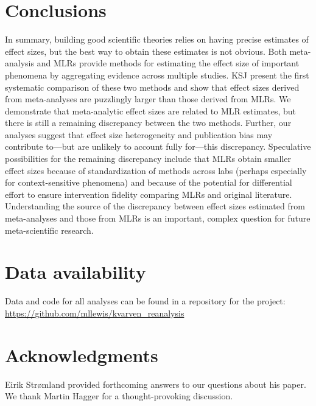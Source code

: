 \documentclass[man]{apa7}
\begin{document}
\section{Conclusions}

In summary, building good scientific theories relies on having precise estimates of effect sizes, but the best way to obtain these estimates is not obvious. Both meta-analysis and MLRs provide methods for estimating the effect size of important phenomena by aggregating evidence across multiple studies. KSJ present the first systematic comparison of these two methods and show that effect sizes derived from meta-analyses are puzzlingly larger than those derived from MLRs. We demonstrate that meta-analytic effect sizes are related to MLR estimates, but there is still a remaining discrepancy between the two methods. Further, our analyses suggest that effect size heterogeneity and publication bias may contribute to---but are unlikely to account fully for---this discrepancy. Speculative possibilities for the remaining discrepancy include that MLRs obtain smaller effect sizes because of standardization of methods across labs (perhaps especially for context-sensitive phenomena) and because of the potential for differential effort to ensure intervention fidelity comparing MLRs and original literature. Understanding the source of the discrepancy between effect sizes estimated from meta-analyses and those from MLRs is an important, complex question for future meta-scientific research. 

\nocite{kvarven2020comparing} 


\section{Data availability}
\noindent Data and code for all analyses can be found in a repository for the project: \href{https://github.com/mllewis/kvarven_reanalysis/}{https://github.com/mllewis/kvarven\_reanalysis}

\section{Acknowledgments} 
\noindent Eirik Str{\o}mland provided forthcoming answers to our questions about his paper. We thank Martin Hagger for a thought-provoking discussion.

\newpage



\pagebreak

\printbibliography
\end{document}
